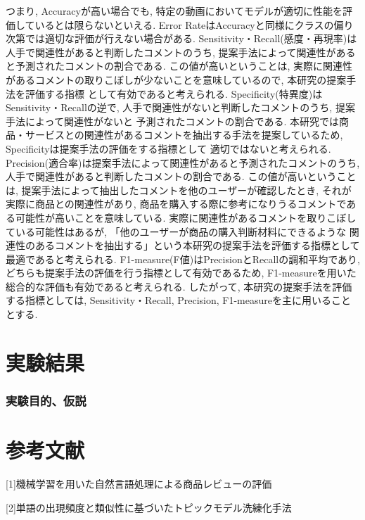 \documentclass{ltjarticle}
\begin{document}
\newpage
\noindent
つまり, Accuracyが高い場合でも, 特定の動画においてモデルが適切に性能を評価しているとは限らないといえる. 
Error RateはAccuracyと同様にクラスの偏り次第では適切な評価が行えない場合がある. 
Sensitivity・Recall(感度・再現率)は人手で関連性があると判断したコメントのうち, 提案手法によって関連性があると予測されたコメントの割合である. 
この値が高いということは, 実際に関連性があるコメントの取りこぼしが少ないことを意味しているので, 本研究の提案手法を評価する指標
として有効であると考えられる. 
Specificity(特異度)はSensitivity・Recallの逆で, 人手で関連性がないと判断したコメントのうち, 提案手法によって関連性がないと
予測されたコメントの割合である. 
本研究では商品・サービスとの関連性があるコメントを抽出する手法を提案しているため, Specificityは提案手法の評価をする指標として
適切ではないと考えられる. 
Precision(適合率)は提案手法によって関連性があると予測されたコメントのうち, 人手で関連性があると判断したコメントの割合である. 
この値が高いということは, 提案手法によって抽出したコメントを他のユーザーが確認したとき, それが実際に商品との関連性があり, 
商品を購入する際に参考になりうるコメントである可能性が高いことを意味している. 
実際に関連性があるコメントを取りこぼしている可能性はあるが, 「他のユーザーが商品の購入判断材料にできるような
関連性のあるコメントを抽出する」という本研究の提案手法を評価する指標として最適であると考えられる. 
F1-measure(F値)はPrecisionとRecallの調和平均であり, どちらも提案手法の評価を行う指標として有効であるため, 
F1-measureを用いた総合的な評価も有効であると考えられる. したがって, 本研究の提案手法を評価する指標としては, Sensitivity・Recall, 
Precision, F1-measureを主に用いることとする. 




\newpage
\part{実験結果}
\section{実験目的、仮説}
\part{参考文献}
[1]機械学習を用いた自然言語処理による商品レビューの評価

[2]単語の出現頻度と類似性に基づいたトピックモデル洗練化手法
\end{document}
